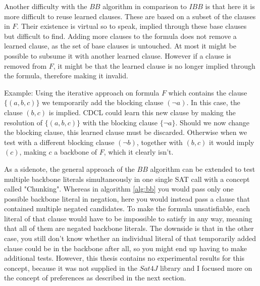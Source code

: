 Another difficulty with the $BB$ algorithm in comparison to $IBB$ is that here it is more difficult to reuse learned clauses. These are based on a subset of the clauses in $F$. Their existence is virtual so to speak, implied through these base clauses but difficult to find. Adding more clauses to the formula does not remove a learned clause, as the set of base clauses is untouched. At most it might be possible to subsume it with another learned clause. However if a clause is removed from $F$, it might be that the learned clause is no longer implied through the formula, therefore making it invalid. 

Example: Using the iterative approach on formula $F$ which contains the clause $\{(a,b,c)\}$ we temporarily add the blocking clause $(\neg a)$. In this case, the clause $(b,c)$ is implied. CDCL could learn this new clause by making the resolution of $\{(a,b,c)\}$ with the blocking clause $\{\neg a\}$. Should we now change the blocking clause, this learned clause must be discarded. Otherwise when we test with a different blocking clause $(\neg b)$, together with $(b,c)$ it would imply $(c)$, making $c$ a backbone of $F$, which it clearly isn't.

As a sidenote, the general approach of the $BB$ algorithm can be extended to test multiple backbone literals simultaneously in one single SAT call with a concept called "Chunking". Whereas in algorithm \ref{alg:bb} you would pass only one possible backbone literal in negation, here you would instead pass a clause that contained multiple negated candidates. To make the formula unsatisfiable, each literal of that clause would have to be impossible to satisfy in any way, meaning that all of them are negated backbone literals. The downside is that in the other case, you still don't know whether an individual literal of that temporarily added clause could be in the backbone after all, so you might end up having to make additional tests. However, this thesis contains no experimental results for this concept, because it was not supplied in the $Sat4J$ library and I focused more on the concept of preferences as described in the next section.



